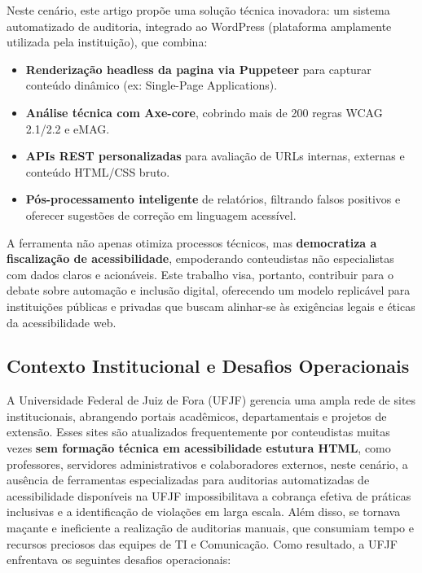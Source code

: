 \documentclass[12pt]{article}
\begin{document}
Neste cenário, este artigo propõe uma solução técnica inovadora: um sistema
automatizado de auditoria, integrado ao WordPress (plataforma amplamente utilizada
pela instituição), que combina:

\begin{itemize}
\item \textbf{Renderização headless da pagina via Puppeteer} para capturar conteúdo
dinâmico (ex: Single-Page Applications).\cite{puppeteer}
\item \textbf{Análise técnica com Axe-core\cite{axecore}}, cobrindo mais de 200 regras WCAG 2.1/2.2 e eMAG.\@
\item \textbf{APIs REST personalizadas} para avaliação de URLs internas, externas e
conteúdo HTML/CSS bruto.
\item \textbf{Pós-processamento inteligente} de relatórios, filtrando falsos
positivos e oferecer sugestões de correção em linguagem acessível.
\end{itemize}

A ferramenta não apenas otimiza processos técnicos, mas \textbf{democratiza a
fiscalização de acessibilidade}, empoderando conteudistas não especialistas com
dados claros e acionáveis. Este trabalho visa, portanto, contribuir para o debate 
sobre automação e inclusão digital, oferecendo um modelo replicável para instituições
públicas e privadas que buscam alinhar-se às exigências legais e éticas da
acessibilidade web.

\subsection{Contexto Institucional e Desafios Operacionais}\label{subsec:contexto}
A Universidade Federal de Juiz de Fora (UFJF) gerencia uma ampla rede de sites
institucionais, abrangendo portais acadêmicos, departamentais e projetos de extensão.
Esses sites são atualizados frequentemente por conteudistas muitas vezes\textbf{ sem formação 
técnica em acessibilidade estutura HTML}, como professores, servidores administrativos e
colaboradores externos, neste cenário, a ausência de ferramentas especializadas para auditorias 
automatizadas de acessibilidade disponíveis na UFJF impossibilitava a cobrança efetiva de
práticas inclusivas e a identificação de violações em larga escala. Além disso, se tornava
maçante e ineficiente a realização de auditorias manuais, que consumiam tempo e recursos
preciosos das equipes de TI e Comunicação. Como resultado, a UFJF enfrentava os seguintes
desafios operacionais: 
\end{document}
